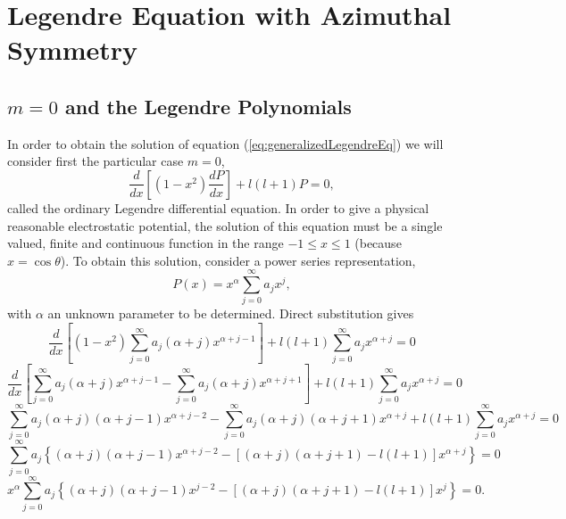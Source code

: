 \section{Legendre Equation with Azimuthal Symmetry}
\subsection{$m=0$ and the Legendre Polynomials}
In order to obtain the solution of equation (\ref{eq:generalizedLegendreEq}) we will consider first the particular case $m=0$,
\begin{equation}
 \frac{d}{dx} \left[ (1-x^2)  \frac{dP}{dx} \right] + l(l+1)  P = 0, \label{eq:differentialLegendreEq}
 \end{equation} 
 called the ordinary Legendre differential equation. In order to give a physical reasonable electrostatic potential, the solution of this equation must be a single valued, finite and continuous function in the range $-1 \leq x \leq 1$ (because $x=\cos \theta$).  To obtain this solution, consider a power series representation,
 \begin{equation}
 P (x) = x^\alpha \sum_{j=0}^\infty a_j x^j,
 \end{equation}
 with $\alpha$ an unknown parameter to be determined. Direct substitution gives
 \begin{equation}
  \frac{d}{dx} \left[ (1-x^2)    \sum_{j=0}^\infty a_j  (\alpha + j) x^{\alpha + j-1}  \right] + l(l+1)\sum_{j=0}^\infty a_j  x^{\alpha+ j}  = 0
 \end{equation} 
  \begin{equation}
  \frac{d}{dx} \left[  \sum_{j=0}^\infty a_j  (\alpha + j) x^{\alpha + j-1} -  \sum_{j=0}^\infty a_j  (\alpha + j) x^{\alpha + j+1}  \right] + l(l+1)\sum_{j=0}^\infty a_j  x^{\alpha+ j}  = 0 
 \end{equation}
\begin{equation}
 \sum_{j=0}^\infty a_j  (\alpha + j)(\alpha + j-1) x^{\alpha + j-2} -  \sum_{j=0}^\infty a_j  (\alpha + j)(\alpha + j+1) x^{\alpha + j}   + l(l+1)\sum_{j=0}^\infty a_j  x^{\alpha+ j}  = 0
 \end{equation}  
 \begin{equation}
 \sum_{j=0}^\infty a_j  \left\lbrace(\alpha + j)(\alpha + j-1) x^{ \alpha+ j-2} - \left[ (\alpha + j)(\alpha + j+1) - l(l+1) \right] x^{\alpha+ j }  \right\rbrace= 0
 \end{equation}
  \begin{equation}
 x^\alpha \sum_{j=0}^\infty a_j  \left\lbrace(\alpha + j)(\alpha + j-1) x^{ j-2} - \left[ (\alpha + j)(\alpha + j+1) - l(l+1) \right] x^{ j }  \right\rbrace = 0. 
 \end{equation}
 
